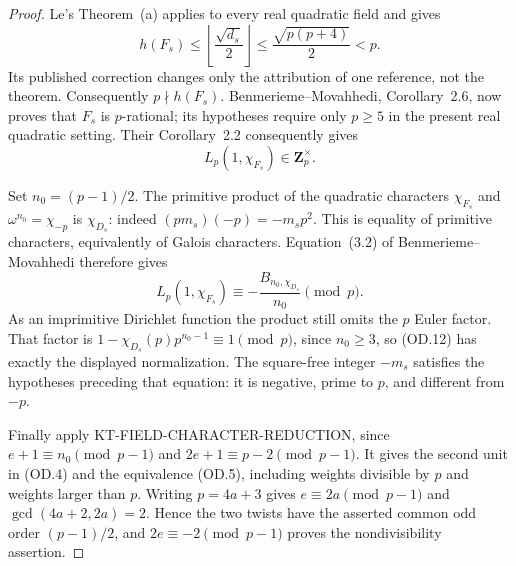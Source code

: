 \documentclass[11pt,a4paper]{article}
\theoremstyle{definition}
\begin{document}
\begin{proof}
Le's Theorem~(a) applies to every real quadratic field and gives
\[
 h(F_s)\leq\left\lfloor\frac{\sqrt{d_s}}2\right\rfloor
 \leq\frac{\sqrt{p(p+4)}}2<p.                            \tag{OD.10}
\]
Its published correction changes only the attribution of one
reference, not the theorem.  Consequently $p\nmid h(F_s)$.
Benmerieme--Movahhedi, Corollary~2.6, now proves that $F_s$ is
$p$-rational; its hypotheses require only $p\geq5$ in the present
real quadratic setting.  Their Corollary~2.2 consequently gives
\[
                    L_p(1,\chi_{F_s})\in\mathbf Z_p^\times.
                                                            \tag{OD.11}
\]

Set $n_0=(p-1)/2$.  The primitive product of the quadratic
characters $\chi_{F_s}$ and $\omega^{n_0}=\chi_{-p}$ is
$\chi_{D_s}$: indeed $(pm_s)(-p)=-m_sp^2$.
This is equality of primitive characters, equivalently of Galois
characters.  Equation~(3.2) of Benmerieme--Movahhedi therefore gives
\[
 L_p(1,\chi_{F_s})\equiv
       -\frac{B_{n_0,\chi_{D_s}}}{n_0}\pmod p.          \tag{OD.12}
\]
As an imprimitive Dirichlet function the product still omits the
$p$ Euler factor.  That factor is
$1-\chi_{D_s}(p)p^{n_0-1}\equiv1\pmod p$, since $n_0\geq3$,
so (OD.12) has exactly the displayed normalization.  The square-free
integer $-m_s$ satisfies the hypotheses preceding that equation:
it is negative, prime to $p$, and different from $-p$.

Finally apply KT-FIELD-CHARACTER-REDUCTION, since
$e+1\equiv n_0\pmod{p-1}$ and $2e+1\equiv p-2\pmod{p-1}$.
It gives the second unit in (OD.4) and the equivalence (OD.5),
including weights divisible by $p$ and weights larger than $p$.
Writing $p=4a+3$ gives $e\equiv2a\pmod{p-1}$ and
$\gcd(4a+2,2a)=2$.  Hence the two twists have the asserted common
odd order $(p-1)/2$, and $2e\equiv-2\pmod{p-1}$ proves the
nondivisibility assertion.
\end{proof}
\end{document}
